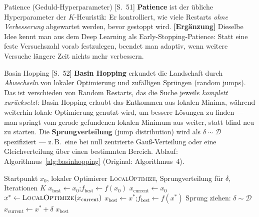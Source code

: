 \begin{defbox}{Patience (Geduld-Hyperparameter) [S.~51]}
\textbf{Patience} ist der übliche Hyperparameter der $K$-Heuristik: Er kontrolliert,
wie viele Restarts \emph{ohne Verbesserung} abgewartet werden, bevor gestoppt wird.
\textbf{[Ergänzung]} Dieselbe Idee kennt man aus dem Deep Learning als
Early-Stopping-Patience: Statt eine feste Versuchszahl vorab festzulegen, beendet man
adaptiv, wenn weitere Versuche längere Zeit nichts mehr verbessern.
\end{defbox}

\begin{defbox}{Basin Hopping [S.~52]}
\textbf{Basin Hopping} erkundet die Landschaft durch \emph{Abwechseln} von lokaler
Optimierung und zufälligen Sprüngen (random jumps). Das ist verschieden von Random
Restarts, das die Suche jeweils \emph{komplett zurücksetzt}: Basin Hopping erlaubt das
Entkommen aus lokalen Minima, während weiterhin lokale Optimierung genutzt wird, um
bessere Lösungen zu finden --- man springt vom gerade gefundenen lokalen Minimum aus
weiter, statt blind neu zu starten. Die \textbf{Sprungverteilung} (jump distribution)
wird als $\delta \sim \mathcal{D}$ spezifiziert --- z.\,B.\ eine bei null zentrierte
Gau{\ss}-Verteilung oder eine Gleichverteilung über einen bestimmten Bereich. Ablauf:
Algorithmus~\ref{alg:basinhopping} (Original: Algorithmus~4).
\end{defbox}

\begin{algorithm}[H]
\caption{Basin Hopping (Original: Algorithmus~4 [S.~52])}
\label{alg:basinhopping}
\begin{algorithmic}[1]
\Require Startpunkt $x_0$, lokaler Optimierer \textsc{LocalOptimize}, Sprungverteilung für $\delta$, Iterationen $K$
\State $x_{\text{best}} \gets x_0$;\quad $f_{\text{best}} \gets f(x_0)$
\State $x_{\text{current}} \gets x_0$
  \State $x^{*} \gets \textsc{LocalOptimize}(x_{\text{current}})$
    \State $x_{\text{best}} \gets x^{*}$;\quad $f_{\text{best}} \gets f(x^{*})$
  \EndIf
  \State Sprung ziehen: $\delta \sim \mathcal{D}$
  \State $x_{\text{current}} \gets x^{*} + \delta$ 
\EndFor
\State \Return $x_{\text{best}}$
\end{algorithmic}
\end{algorithm}

